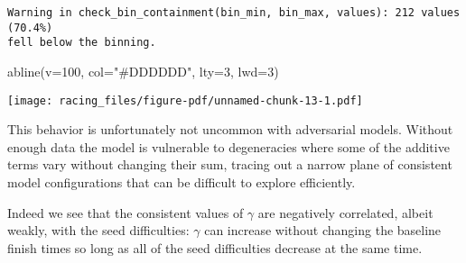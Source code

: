 \documentclass[
  letterpaper,
  DIV=11,
  numbers=noendperiod]{scrartcl}
\newenvironment{Shaded}{\begin{snugshade}}{\end{snugshade}}
\newcommand{\AttributeTok}[1]{\textcolor[rgb]{0.40,0.45,0.13}{#1}}
\newcommand{\DecValTok}[1]{\textcolor[rgb]{0.68,0.00,0.00}{#1}}
\newcommand{\FunctionTok}[1]{\textcolor[rgb]{0.28,0.35,0.67}{#1}}
\newcommand{\NormalTok}[1]{\textcolor[rgb]{0.00,0.23,0.31}{#1}}
\newcommand{\OtherTok}[1]{\textcolor[rgb]{0.00,0.23,0.31}{#1}}
\newcommand{\SpecialCharTok}[1]{\textcolor[rgb]{0.37,0.37,0.37}{#1}}
\newcommand{\StringTok}[1]{\textcolor[rgb]{0.13,0.47,0.30}{#1}}
\begin{document}
\begin{Shaded}
\end{Shaded}

\begin{verbatim}
Warning in check_bin_containment(bin_min, bin_max, values): 212 values (70.4%)
fell below the binning.
\end{verbatim}

\begin{Shaded}
\begin{Highlighting}[]
\FunctionTok{abline}\NormalTok{(}\AttributeTok{v=}\DecValTok{100}\NormalTok{, }\AttributeTok{col=}\StringTok{"\#DDDDDD"}\NormalTok{, }\AttributeTok{lty=}\DecValTok{3}\NormalTok{, }\AttributeTok{lwd=}\DecValTok{3}\NormalTok{)}
\end{Highlighting}
\end{Shaded}

\texttt{[image: racing\_files/figure-pdf/unnamed-chunk-13-1.pdf]}

This behavior is unfortunately not uncommon with adversarial models.
Without enough data the model is vulnerable to degeneracies where some
of the additive terms vary without changing their sum, tracing out a
narrow plane of consistent model configurations that can be difficult to
explore efficiently.

Indeed we see that the consistent values of \(\gamma\) are negatively
correlated, albeit weakly, with the seed difficulties: \(\gamma\) can
increase without changing the baseline finish times so long as all of
the seed difficulties decrease at the same time.
\end{document}

